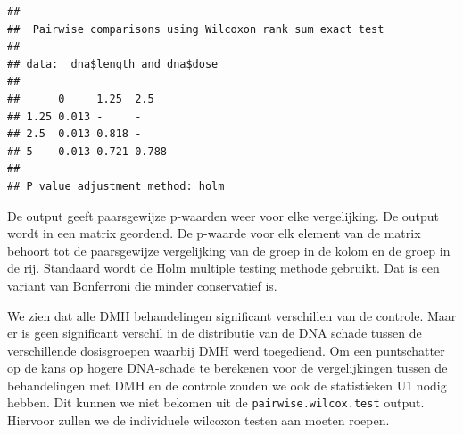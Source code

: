 \documentclass[
  12pt,dutch]{book}
\newenvironment{Shaded}{\begin{snugshade}}{\end{snugshade}}
\newcommand{\AttributeTok}[1]{\textcolor[rgb]{0.13,0.29,0.53}{#1}}
\newcommand{\ControlFlowTok}[1]{\textcolor[rgb]{0.13,0.29,0.53}{\textbf{#1}}}
\newcommand{\DecValTok}[1]{\textcolor[rgb]{0.00,0.00,0.81}{#1}}
\newcommand{\FunctionTok}[1]{\textcolor[rgb]{0.13,0.29,0.53}{\textbf{#1}}}
\newcommand{\NormalTok}[1]{#1}
\newcommand{\OtherTok}[1]{\textcolor[rgb]{0.56,0.35,0.01}{#1}}
\newcommand{\SpecialCharTok}[1]{\textcolor[rgb]{0.81,0.36,0.00}{\textbf{#1}}}
\newcommand{\StringTok}[1]{\textcolor[rgb]{0.31,0.60,0.02}{#1}}
\theoremstyle{definition}
\theoremstyle{definition}
\theoremstyle{definition}
\theoremstyle{definition}
\theoremstyle{remark}
\begin{document}
\begin{verbatim}
## 
##  Pairwise comparisons using Wilcoxon rank sum exact test 
## 
## data:  dna$length and dna$dose 
## 
##      0     1.25  2.5  
## 1.25 0.013 -     -    
## 2.5  0.013 0.818 -    
## 5    0.013 0.721 0.788
## 
## P value adjustment method: holm
\end{verbatim}

De output geeft paarsgewijze p-waarden weer voor elke vergelijking. De output wordt in een matrix geordend.
De p-waarde voor elk element van de matrix behoort tot de paarsgewijze vergelijking van de groep in de kolom en de groep in de rij.
Standaard wordt de Holm multiple testing methode gebruikt. Dat is een variant van Bonferroni die minder conservatief is.

We zien dat alle DMH behandelingen significant verschillen van de controle.
Maar er is geen significant verschil in de distributie van de DNA schade tussen de verschillende dosisgroepen waarbij DMH werd toegediend.
Om een puntschatter op de kans op hogere DNA-schade te berekenen voor de vergelijkingen tussen de behandelingen met DMH en de controle zouden we ook de statistieken U1 nodig hebben.
Dit kunnen we niet bekomen uit de \texttt{pairwise.wilcox.test} output.
Hiervoor zullen we de individuele wilcoxon testen aan moeten roepen.

\begin{Shaded}
\end{Shaded}
\end{document}
